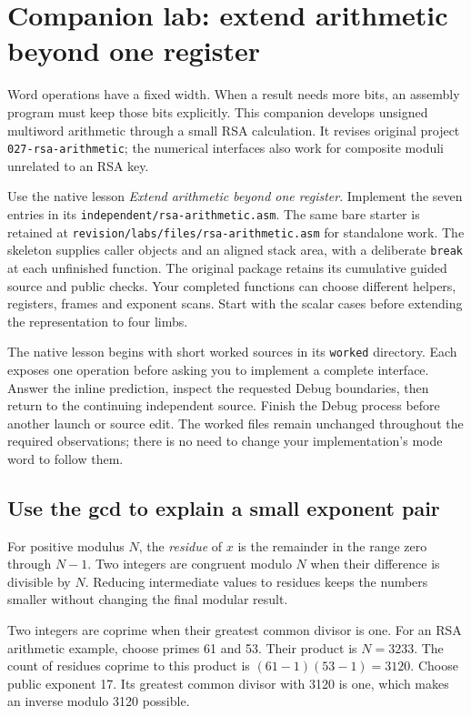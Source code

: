 \section{Companion lab: extend arithmetic beyond one register}
\label{revision-lab:rsa}

Word operations have a fixed width. When a result needs more bits, an assembly
program must keep those bits explicitly. This companion develops unsigned
multiword arithmetic through a small RSA calculation. It revises original project
\texttt{027-rsa-arithmetic}; the numerical interfaces also work for composite
moduli unrelated to an RSA key.

Use the native lesson \emph{Extend arithmetic beyond one register}. Implement
the seven entries in its \texttt{independent/rsa-arithmetic.asm}. The same bare
starter is retained at \texttt{revision/labs/files/rsa-arithmetic.asm} for
standalone work. The skeleton supplies caller
objects and an aligned stack area, with a deliberate \texttt{break} at each
unfinished function. The original package retains its cumulative guided source
and public checks. Your completed functions can choose different helpers,
registers, frames and exponent scans. Start with the scalar cases before extending
the representation to four limbs.

The native lesson begins with short worked sources in its \texttt{worked}
directory. Each exposes one operation before asking you to implement a complete
interface. Answer the inline prediction, inspect the requested Debug boundaries,
then return to the continuing independent source. Finish the Debug process before
another launch or source edit. The worked files remain unchanged throughout the
required observations; there is no need to change your implementation's mode
word to follow them.

\subsection*{Use the gcd to explain a small exponent pair}

For positive modulus $N$, the \emph{residue} of $x$ is the remainder in the
range zero through $N-1$. Two integers are congruent modulo $N$ when their
difference is divisible by $N$. Reducing intermediate values to residues keeps
the numbers smaller without changing the final modular result.

Two integers are coprime when their greatest common divisor is one.
For an RSA arithmetic example, choose primes 61 and 53. Their product is
$N=3233$. The count of residues coprime to this product is
$(61-1)(53-1)=3120$. Choose public exponent 17. Its greatest common divisor
with 3120 is one, which makes an inverse modulo 3120 possible.

